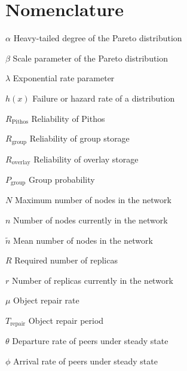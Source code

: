 \chapter{Nomenclature}

\newlength{\gnat}

\begin{Nomencl}[\gnat]

        \item[$\alpha$]                 Heavy-tailed degree of the Pareto distribution
        \item[$\beta$]                  Scale parameter of the Pareto distribution
        \item[$\lambda$]                Exponential rate parameter
        \item[$h(x)$]                   Failure or hazard rate of a distribution

        \item[$R_{\textrm{Pithos}}$]    Reliability of Pithos
        \item[$R_{\textrm{group}}$]     Reliability of group storage
        \item[$R_{\textrm{overlay}}$]   Reliability of overlay storage
        \item[$P_{\textrm{group}}$]     Group probability

		\item[$N$]                      Maximum number of nodes in the network
        \item[$n$]                      Number of nodes currently in the network
        \item[$\tilde{n}$]              Mean number of nodes in the network
        \item[$R$]                      Required number of replicas
        \item[$r$]                      Number of replicas currently in the network
        \item[$\mu$]                    Object repair rate
        \item[$T_{\textrm{repair}}$]    Object repair period
        \item[$\theta$]                 Departure rate of peers under steady state
        \item[$\phi$]                   Arrival rate of peers under steady state


\end{Nomencl}
